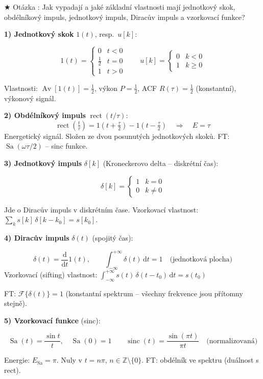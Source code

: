 \documentclass[12pt,a4paper]{article}
\newcommand{\FT}{\mathcal{F}}
\newcommand{\Av}{\operatorname{Av}}
\newcommand{\Sa}{\operatorname{Sa}}
\newcommand{\sinc}{\operatorname{sinc}}
\newcommand{\rect}{\operatorname{rect}}
\newcommand{\dd}{\mathrm{d}}
\newcounter{otcnt}
\newcommand{\QA}[2]{%
  \stepcounter{otcnt}%
  \begin{Otazka}{}%
    $\bigstar$ Otázka \theotcnt: #1%
  \end{Otazka}%
  \begin{Odpoved}%
    #2%
  \end{Odpoved}%
  \vspace{1em}%
}
\begin{document}
\QA{Jak vypadají a jaké základní vlastnosti mají jednotkový skok, obdélníkový impuls, jednotkový impuls, Diracův impuls a vzorkovací funkce?}{%

  \textbf{1) Jednotkový skok} $1(t)$, resp.\ $u[k]$:
  \begin{Vzorec}[]
  \[
    1(t) = \begin{cases} 0 & t < 0 \\ \tfrac{1}{2} & t = 0 \\ 1 & t > 0 \end{cases}
    \qquad
    u[k] = \begin{cases} 0 & k < 0 \\ 1 & k \geq 0 \end{cases}
  \]
  \end{Vzorec}
  Vlastnosti: $\Av[1(t)] = \tfrac{1}{2}$, výkon $P = \tfrac{1}{2}$, ACF $R(\tau) = \tfrac{1}{2}$ (konstantní), výkonový signál.

  \vspace{0.5em}
  \textbf{2) Obdélníkový impuls} $\rect(t/\tau)$:
  \[
    \rect\!\left(\tfrac{t}{\tau}\right) = 1\!\left(t+\tfrac{\tau}{2}\right) - 1\!\left(t-\tfrac{\tau}{2}\right)
    \quad \Rightarrow \quad E = \tau
  \]
  Energetický signál. Složen ze dvou posunutých jednotkových skoků. FT: $\Sa(\omega\tau/2)$ – sinc funkce.

  \vspace{0.5em}
  \textbf{3) Jednotkový impuls} $\delta[k]$ (Kroneckerovo delta – diskrétní čas):
  \begin{Vzorec}[]
  \[
    \delta[k] = \begin{cases} 1 & k = 0 \\ 0 & k \neq 0 \end{cases}
  \]
  \end{Vzorec}
  Jde o Diracův impuls v diskrétním čase. Vzorkovací vlastnost: $\sum_k s[k]\,\delta[k-k_0] = s[k_0]$.

  \vspace{0.5em}
  \textbf{4) Diracův impuls} $\delta(t)$ (spojitý čas):
  \begin{Vzorec}[]
  \[
    \delta(t) = \frac{\dd}{\dd t}1(t),
    \qquad
    \int_{-\infty}^{+\infty}\!\delta(t)\,\dd t = 1 \quad \text{(jednotková plocha)}
  \]
  Vzorkovací (sifting) vlastnost: $\displaystyle\int_{-\infty}^{+\infty} s(t)\,\delta(t-t_0)\,\dd t = s(t_0)$
  \end{Vzorec}
  FT: $\FT\{\delta(t)\} = 1$ (konstantní spektrum – všechny frekvence jsou přítomny stejně).

  \vspace{0.5em}
  \textbf{5) Vzorkovací funkce} (sinc):
  \begin{Vzorec}[]
  \[
    \Sa(t) = \frac{\sin t}{t},\quad \Sa(0)=1
    \qquad
    \sinc(t) = \frac{\sin(\pi t)}{\pi t} \quad \text{(normalizovaná)}
  \]
  \end{Vzorec}
  Energie: $E_{\Sa}=\pi$. Nuly v $t=n\pi$, $n\in\mathbb{Z}\setminus\{0\}$. FT: obdélník ve spektru (duálnost s rect).

}
\end{document}
